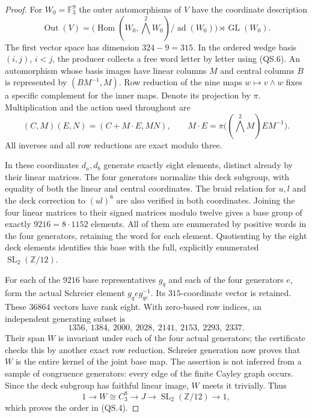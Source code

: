 \begin{proof}
For $W_0=\mathbb F_3^9$ the outer automorphisms of $V$ have the
coordinate description
\[
 \operatorname{Out}(V)
  =\bigl(\operatorname{Hom}(W_0,\bigwedge^2W_0)
          /\operatorname{ad}(W_0)\bigr)
       \rtimes\operatorname{GL}(W_0).
                                                        \tag{QS.11}
\]
The first vector space has dimension $324-9=315$.
In the ordered wedge basis $(i,j)$, $i<j$, the producer
collects a free word letter by letter using (QS.6).
An automorphism whose basis images have linear columns $M$
and central columns $B$ is represented by $(BM^{-1},M)$.
Row reduction of the nine maps $w\mapsto v\wedge w$ fixes
a specific complement for the inner maps.  Denote its projection
by $\pi$.  Multiplication and the action used throughout are
\[
 (C,M)(E,N)=(C+M\cdot E,MN),\qquad
 M\cdot E=\pi\bigl((\bigwedge^2M)EM^{-1}\bigr).
                                                        \tag{QS.12}
\]
All inverses and all row reductions are exact modulo three.

In these coordinates $d_a,d_b$ generate exactly eight
elements, distinct already by their linear matrices.  The
four generators normalize this deck subgroup, with equality
of both the linear and central coordinates.  The braid
relation for $u,l$ and the deck correction to $(ul)^6$ are
also verified in both coordinates.  Joining the four linear
matrices to their signed matrices modulo twelve gives a base
group of exactly $9216=8\cdot1152$ elements.  All of them are
enumerated by positive words in the four generators, retaining
the word for each element.  Quotienting by the eight deck
elements identifies this base with the full, explicitly
enumerated $\operatorname{SL}_2(\mathbb Z/12)$.

For each of the $9216$ base representatives $g_q$ and each of
the four generators $e$, form the actual Schreier element
$g_q e g_{qe}^{-1}$.  Its $315$-coordinate vector is retained.
These $36864$ vectors have rank eight.  With zero-based row
indices, an independent generating subset is
\[
 1356,\ 1384,\ 2000,\ 2028,\ 2141,\ 2153,\ 2293,\ 2337.
                                                        \tag{QS.13}
\]
Their span $W$ is invariant under each of the four actual
generators; the certificate checks this by another exact row
reduction.  Schreier generation now proves that $W$ is the
entire kernel of the joint base map.  The assertion is not
inferred from a sample of congruence generators: every edge
of the finite Cayley graph occurs.  Since the deck subgroup
has faithful linear image, $W$ meets it trivially.  Thus
\[
 1\longrightarrow W\cong C_3^8\longrightarrow J
 \longrightarrow\operatorname{SL}_2(\mathbb Z/12)
 \longrightarrow1,                                    \tag{QS.14}
\]
which proves the order in (QS.4).


\end{proof}
